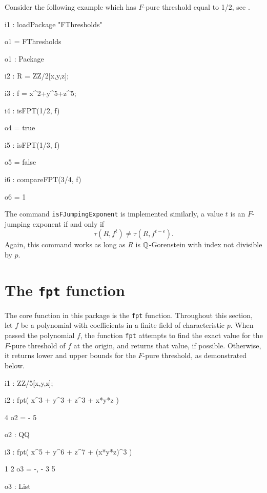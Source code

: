 \documentclass{amsart}
\begin{document}
Consider the following example which has $F$-pure threshold equal to {1/2}, see \cite[Example 4.3]{MustataYoshidaTestIdealVsMultiplierIdeals}.
\medskip
{\small
{}
\begin{MyVerbatim}
i1 : loadPackage "FThresholds"

o1 = FThresholds

o1 : Package

i2 : R = ZZ/2[x,y,z];

i3 : f = x^2+y^5+z^5;

i4 : isFPT(1/2, f)

o4 = true

i5 : isFPT(1/3, f)

o5 = false

i6 : compareFPT(3/4, f)

o6 = 1
\end{MyVerbatim}
}
\medskip

The command {\tt isFJumpingExponent} is implemented similarly, a value $t$ is an $F$-jumping exponent if and only if
\[
\tau(R, f^t) \neq \tau(R, f^{t-\epsilon}).
\]
Again, this command works as long as $R$ is $\mathbb{Q}$-Gorenstein with index not divisible by $p$.


\newpage
\section{The {\tt fpt} function}
\label{sec.FPT}

The core function in this package is the {\tt fpt} function.  Throughout this section, let $f$ be a polynomial with coefficients in a finite field of characteristic $p$. When passed the polynomial $f$, the function {\tt fpt} attempts to find the exact value for the $F$-pure threshold of $f$ at the origin, and returns that value, if possible.  Otherwise, it returns lower and upper bounds for the $F$-pure threshold, as demonstrated below.

{\small
{}
\begin{MyVerbatim}

i1 : ZZ/5[x,y,z];

i2 : fpt( x^3 + y^3 + z^3 + x*y*z )

     4
o2 = -
     5

o2 : QQ

i3 : fpt( x^5 + y^6 + z^7 + (x*y*z)^3 )

      1  2
o3 = {-, -}
      3  5

o3 : List

\end{MyVerbatim}
}
\end{document}
